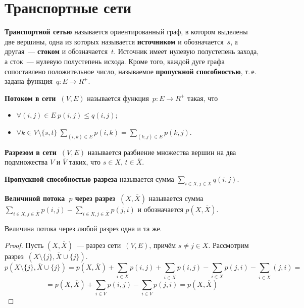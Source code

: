 \section{Транспортные сети}
   \textbf{Транспортной сетью} называется ориентированный граф, в котором выделены две вершины, одна из которых называется \textbf{источником} и обозначается~$s$, а другая~--- \textbf{стоком} и обозначается~$t$.
Источник имеет нулевую полустепень захода, а сток~--- нулевую полустепень исхода.
 Кроме того, каждой дуге графа сопоставлено положительное число, называемое \textbf{пропускной способностью}, т.\,е. задана функция~$q \colon E \to R^+$.

 \textbf{Потоком в сети~$(V, E)$} называется функция~$p \colon E \to R^+$ такая, что
\begin{itemize}
	\item $\forall (i, j) \in E \ p(i, j) \leqslant q(i, j)$;
	\item $\forall k \in V \setminus \{ s, t \} \ \sum\limits_{(i, k) \in E} p(i, k) = \sum\limits_{(k, j) \in E} p(k, j)$.
\end{itemize}

 \textbf{Разрезом в сети~$(V, E)$} называется разбиение множества вершин на два подмножества $V$ и $\overline V$ таких, что $s \in X$, $t \in \overline X$.

\textbf{Пропускной способностью разреза} называется сумма $\sum\limits_{i \in X, j \in \overline X} q(i, j)$.

\textbf{Величиной потока~$p$ через разрез~$(X, \overline X)$} называется сумма $\sum\limits_{i \in X, j \in \overline X} p(i, j) -
\sum\limits_{i \in X, j \in \overline X} p(j, i)$ и обозначается $p(X, \overline X)$.

\begin{lemma}
Величина потока через любой разрез одна и та же.
\end{lemma}
\begin{proof}
Пусть $(X, \overline X)$~--- разрез сети~$(V, E)$, причём $s \neq j \in X$.
Рассмотрим разрез~$(X \setminus \{ j \}, \overline X \cup \{ j \})$.
\begin{equation*}
p(X \setminus \{ j \}, \overline X \cup \{ j \}) = p(X, \overline X) +
\sum_{i \in X} p(i, j) + \sum_{i \in \overline X} p(i, j) -
\sum_{i \in X} p(j, i) - \sum_{i \in \overline X} (j, i) =
\end{equation*}
\begin{equation*}
= p(X, \overline X) + \sum_{i \in V} p(i, j) - \sum_{i \in V} p(j, i) =
p(X, \overline X)
\end{equation*}
\end{proof}

